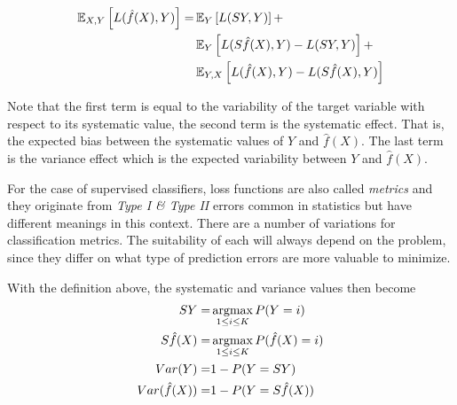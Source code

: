 \begin{appendices}
\begin{equation}
\begin{split}
\operatorname{\mathbb{E}}_{X,Y} \left[ L(\hat{f}(X),Y )\right] = & \operatorname{\mathbb{E}}_{Y} \left[ L(SY,Y )\right] + \\
 & \operatorname{\mathbb{E}}_{Y} \left[ L(S\hat{f}(X),Y ) - L(SY,Y )\right] + \\
 & \operatorname{\mathbb{E}}_{Y,X} \left[ L(\hat{f}(X),Y ) - L(S\hat{f}(X),Y )\right]
\end{split}
\end{equation}

Note that the first term is equal to the variability of the target variable with respect to its systematic value, the second term is the systematic effect.
That is, the expected bias between the systematic values of $Y$ and $\hat{f}(X)$.
The last term is the variance effect which is the expected variability between $Y$ and $\hat{f}(X)$.


For the case of supervised classifiers, loss functions are also called \textit{metrics} and they originate from \textit{Type I \& Type II} errors common in statistics but have different meanings in this context.
There are a number of variations for classification metrics.
The suitability of each will always depend on the problem, since they differ on what type of prediction errors are more valuable to minimize.

With the definition above, the systematic and variance values then become
\begin{equation}
	\begin{split}
	SY = & \operatorname*{argmax}_{1\leq i \leq K} P(Y=i) \\
	S\hat{f}(X) = &\operatorname*{argmax}_{1\leq i \leq K} P(\hat{f}(X)=i) \\
	Var(Y) = &1 - P(Y=SY) \\
	Var(\hat{f}(X)) =& 1 - P(Y = S\hat{f}(X)) \\
	\end{split}
\end{equation}



\end{appendices}
